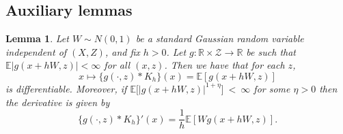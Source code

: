 \documentclass[aos]{imsart}
\newcommand{\R}{\mathbb{R}}
\newcommand{\E}{\mathbb{E}}
\newtheorem{lemma}[theorem]{Lemma}
\begin{document}
	\subsection{Auxiliary lemmas}
	\begin{lemma}
		\label{lem:convolution}
		Let $W\sim N(0,1)$ be a standard Gaussian random variable independent of $(X,Z)$, and fix $h>0$. Let $g:\R \times \mathcal{Z} \to \R$ be such that $\E|g(x+hW,z)| < \infty$ for all $(x,z)$. Then we have that for each $z$,
		\begin{equation*}
			x \mapsto \{g(\cdot,z)*K_h\}(x) =  \E[g(x+hW,z)]
		\end{equation*}
		is differentiable.
		Moreover, if $\E\big[|g(x+hW,z)|^{1+\eta}\big]~<~\infty$ for some $\eta>0$ then the derivative is given by \begin{equation*}
			\{g(\cdot,z)*K_h\}'(x) =  \frac1h\E[Wg(x+hW,z)].
		\end{equation*}
	\end{lemma}
\end{document}
